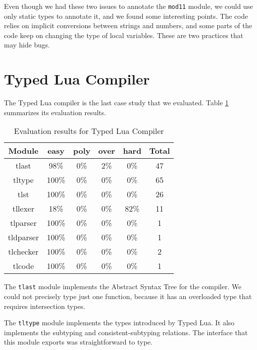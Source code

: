 Even though we had these two issues to annotate the \texttt{mod11} module,
we could use only static types to annotate it, and we found some interesting
points.
The code relies on implicit conversions between strings and numbers,
and some parts of the code keep on changing the type of local variables.
These are two practices that may hide bugs.

\section{Typed Lua Compiler}

The Typed Lua compiler is the last case study that we evaluated.
Table \ref{tab:evaltlc} summarizes its evaluation results.

\begin{table}[!ht]
\begin{center}
\begin{tabular}{|c|c|c|c|c|c|}
\hline
\textbf{Module} & \textbf{easy} & \textbf{poly} & \textbf{over} & \textbf{hard} & \textbf{Total} \\
\hline
tlast & 98\% & 0\% & 2\% & 0\% & 47 \\ %
\hline
tltype & 100\% & 0\% & 0\% & 0\% & 65 \\ %
\hline
tlst & 100\% & 0\% & 0\% & 0\% & 26 \\ %
\hline
tllexer & 18\% & 0\% & 0\% & 82\% & 11 \\ %
\hline
tlparser & 100\% & 0\% & 0\% & 0\% & 1 \\ %
\hline
tldparser & 100\% & 0\% & 0\% & 0\% & 1 \\ %
\hline
tlchecker & 100\% & 0\% & 0\% & 0\% & 2 \\ %
\hline
tlcode & 100\% & 0\% & 0\% & 0\% & 1 \\ %
\hline
\end{tabular}
\end{center}
\caption{Evaluation results for Typed Lua Compiler}
\label{tab:evaltlc}
\end{table}

The \texttt{tlast} module implements the Abstract Syntax Tree for
the compiler.
We could not precisely type just one function, because it has
an overloaded type that requires intersection types.

The \texttt{tltype} module implements the types introduced by Typed Lua.
It also implements the subtyping and consistent-subtyping relations.
The interface that this module exports was straightforward to type.

